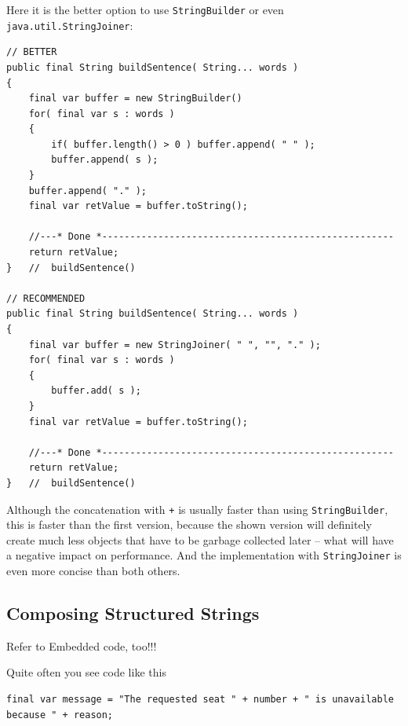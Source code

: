 Here it is the better option to use \lstinline|StringBuilder| or even \lstinline|java.util.StringJoiner|\autocite{ORACLE_DOC_STRINGJOINER_CLASS}:
\begin{lstlisting}
// BETTER
public final String buildSentence( String... words )
{
    final var buffer = new StringBuilder()
    for( final var s : words )
    {
        if( buffer.length() > 0 ) buffer.append( " " );
        buffer.append( s );
    }
    buffer.append( "." );
    final var retValue = buffer.toString();
    
    //---* Done *----------------------------------------------------
    return retValue;
}   //  buildSentence()

// RECOMMENDED
public final String buildSentence( String... words )
{
    final var buffer = new StringJoiner( " ", "", "." );
    for( final var s : words )
    {
        buffer.add( s );
    }
    final var retValue = buffer.toString();
    
    //---* Done *----------------------------------------------------
    return retValue;
}   //  buildSentence()
\end{lstlisting}

Although the concatenation with \verb#+# is usually faster than using \lstinline|StringBuilder|, this is faster than the first version, because the shown version will definitely create much less objects that have to be garbage collected later – what will have a negative impact on performance. And the implementation with \lstinline|StringJoiner| is even more concise than both others.


\subsection{Composing Structured Strings}\label{sec:ComposingStructuredStrings}


Refer to Embedded code, too!!!



Quite often you see code like this
\begin{lstlisting}
final var message = "The requested seat " + number + " is unavailable because " + reason;
\end{lstlisting}

